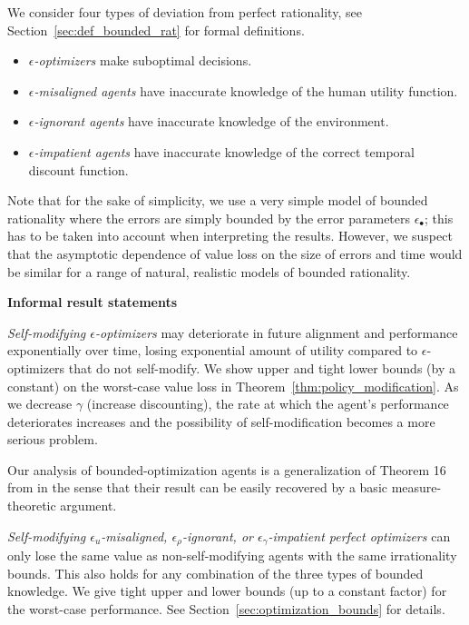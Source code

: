 \smallskip
We consider four types of deviation from perfect rationality, see Section~\ref{sec:def_bounded_rat} for formal definitions.

\begin{itemize}
\item \emph{$\epsilon$-optimizers} make suboptimal decisions.
\item \emph{$\epsilon$-misaligned agents} have inaccurate knowledge of the human utility function.
\item \emph{$\epsilon$-ignorant agents} have inaccurate knowledge of the environment.
\item \emph{$\epsilon$-impatient agents} have inaccurate knowledge of the correct temporal discount function.
\end{itemize}

Note that for the sake of simplicity, we use a very simple model of bounded rationality where the errors are simply bounded by the error parameters $\epsilon_\bullet$; this has to be taken into account when interpreting the results. However, we suspect that the asymptotic dependence of value loss on the size of errors and time would be similar for a range of natural, realistic models of bounded rationality.

\medskip
\noindent
\textbf{Informal result statements}

\medskip
\noindent
\emph{Self-modifying $\epsilon$-optimizers} may deteriorate in future alignment and performance exponentially over time, losing exponential amount of utility compared to $\epsilon$-optimizers that do not self-modify. We show upper and tight lower bounds (by a constant) on the worst-case value loss in Theorem~\ref{thm:policy_modification}. As we decrease $\gamma$ (increase discounting), the rate at which the agent's performance deteriorates increases and the possibility of self-modification becomes a more serious problem. 

Our analysis of bounded-optimization agents is a generalization of Theorem 16 from \citet{everitt} in the sense that their result can be easily recovered by a basic measure-theoretic argument.

\medskip
\noindent
\emph{Self-modifying $\epsilon_u$-misaligned, $\epsilon_\rho$-ignorant, or $\epsilon_\gamma$-impatient perfect optimizers} can only lose the same value as non-self-modifying agents with the same irrationality bounds. This also holds for any combination of the three types of bounded knowledge. We give tight upper and lower bounds (up to a constant factor) for the worst-case performance. See Section~\ref{sec:optimization_bounds} for details.

